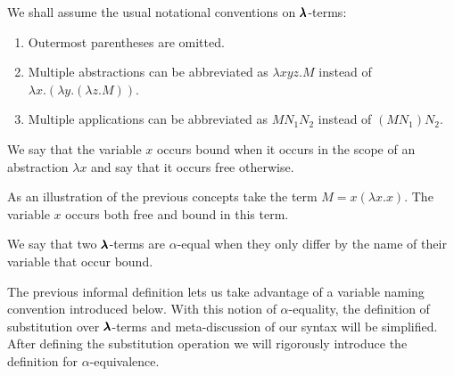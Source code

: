 \begin{notation}
  We shall assume the usual notational conventions on $\pmb{\lambda}$-terms:

  \begin{enumerate}
  \item Outermost parentheses are omitted.
  \item Multiple abstractions can be abbreviated as $\lambda x y z . M$ instead of  $\lambda x . (\lambda y . (\lambda z . M))$.
  \item Multiple applications can be abbreviated as $M N_1 N_2$ instead of $(M N_1) N_2$.
  \end{enumerate}
\end{notation}

\begin{comment}
\begin{definition}[Free variables]
  For every $\Lam$-term $M$, we recursively define the set of free variables in $M$, $FV(M)$, as follows:  
  \begin{align*}
    & FV( x ) = \{ x \}, \\
    & FV( \lambda x . M ) = FV(M) - \{ x \}, \\
    & FV( M N ) = FV(M) \cup FV(N).
  \end{align*}
\end{definition}
\end{comment}

\begin{definition}
  We say that the variable $x$ occurs bound when it occurs in the scope of an abstraction $\lambda x$ and say that it occurs free otherwise.
\end{definition}

As an illustration of the previous concepts take the term $M = x (\lambda x . x)$.
The variable $x$ occurs both free and bound in this term.

\begin{definition}
  We say that two $\pmb{\lambda}$-terms are $\alpha$-equal when they only differ by the name of their variable that occur bound.
\end{definition}

\begin{remark}
  The previous informal definition lets us take advantage of a variable naming convention introduced below.
  With this notion of $\alpha$-equality, the definition of substitution over $\pmb{\lambda}$-terms and meta-discussion of our syntax will be simplified.
  After defining the substitution operation we will rigorously introduce the definition for $\alpha$-equivalence.
\end{remark}

